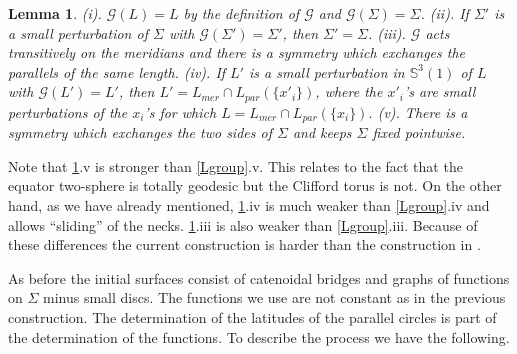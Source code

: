 \documentclass[12pt,namelimits,sumlimits]{amsart}
\newtheorem{lemma}[theorem]{Lemma}
\theoremstyle{remark}
\numberwithin{equation}{section}
\begin{document}
\addtocounter{equation}{1}
\begin{lemma}
\label{Lgroup2}
(i). 
${{\mathscr{G}}}(L)=L$ by the definition of ${{\mathscr{G}}}$
and ${{\mathscr{G}}}(\Sigma)=\Sigma$.
\newline
(ii).
If $\Sigma'$ is a small perturbation 
of $\Sigma$ with 
${{\mathscr{G}}}(\Sigma')=\Sigma'$, then $\Sigma'=\Sigma$.
\newline
(iii). ${{\mathscr{G}}}$ acts transitively on the meridians
and there is a symmetry which exchanges the parallels of the same length.
\newline
(iv). 
If $L'$ is a small perturbation in ${\mathbb{S}}^3(1)$ of $L$ with 
${{\mathscr{G}}}(L')=L'$, then $L'={{L_{mer}}}\cap{{L_{par}}}(\{x'_i\})$,
where the $x'_i$'s are small perturbations of the $x_i$'s for which
$L={{L_{mer}}}\cap{{L_{par}}}(\{x_i\})$.
\newline
(v). 
There is a symmetry which exchanges the two sides of $\Sigma$ and keeps
$\Sigma$ fixed pointwise.
\end{lemma}

Note that \ref{Lgroup2}.v is stronger than \ref{Lgroup}.v.
This relates to the fact that the equator two-sphere is totally geodesic but the Clifford torus is not.
On the other hand,
as we have already mentioned,
\ref{Lgroup2}.iv is much weaker than \ref{Lgroup}.iv and allows ``sliding'' of the necks.
\ref{Lgroup2}.iii is also weaker than \ref{Lgroup}.iii.
Because of these differences the current construction is harder than the construction in \cite{kapouleas:clifford}.

As before the initial surfaces consist of catenoidal bridges and graphs of functions on $\Sigma$ minus small discs.
The functions we use are not constant as in the previous construction.
The determination of the latitudes of the parallel circles is part of the determination of the functions.
To describe the process we have the following.
\end{document}
